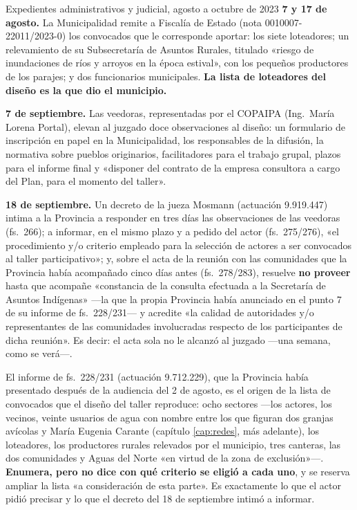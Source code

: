 \begin{ficha}{Expedientes administrativos y judicial, agosto a octubre de 2023}
\textbf{7 y 17 de agosto.} La Municipalidad remite a Fiscalía de Estado (nota 0010007-22011/2023-0) los convocados que le corresponde aportar: los siete loteadores; un relevamiento de su Subsecretaría de Asuntos Rurales, titulado «riesgo de inundaciones de ríos y arroyos en la época estival», con los pequeños productores de los parajes; y dos funcionarios municipales. \textbf{La lista de loteadores del diseño es la que dio el municipio.}

\textbf{7 de septiembre.} Las veedoras, representadas por el COPAIPA (Ing.\ María Lorena Portal), elevan al juzgado doce observaciones al diseño: un formulario de inscripción en papel en la Municipalidad, los responsables de la difusión, la normativa sobre pueblos originarios, facilitadores para el trabajo grupal, plazos para el informe final y «disponer del contrato de la empresa consultora a cargo del Plan, para el momento del taller».

\textbf{18 de septiembre.} Un decreto de la jueza Mosmann (actuación 9.919.447) intima a la Provincia a responder en tres días las observaciones de las veedoras (fs.\ 266); a informar, en el mismo plazo y a pedido del actor (fs.\ 275/276), «el procedimiento y/o criterio empleado para la selección de actores a ser convocados al taller participativo»; y, sobre el acta de la reunión con las comunidades que la Provincia había acompañado cinco días antes (fs.\ 278/283), resuelve \textbf{no proveer} hasta que acompañe «constancia de la consulta efectuada a la Secretaría de Asuntos Indígenas» ---la que la propia Provincia había anunciado en el punto 7 de su informe de fs.\ 228/231--- y acredite «la calidad de autoridades y/o representantes de las comunidades involucradas respecto de los participantes de dicha reunión». Es decir: el acta sola no le alcanzó al juzgado ---una semana, como se verá---.

El informe de fs.\ 228/231 (actuación 9.712.229), que la Provincia había presentado después de la audiencia del 2 de agosto, es el origen de la lista de convocados que el diseño del taller reproduce: ocho sectores ---los actores, los vecinos, veinte usuarios de agua con nombre entre los que figuran dos granjas avícolas y María Eugenia Carante (capítulo \ref{cap:redes}, más adelante), los loteadores, los productores rurales relevados por el municipio, tres canteras, las dos comunidades y Aguas del Norte «en virtud de la zona de exclusión»---. \textbf{Enumera, pero no dice con qué criterio se eligió a cada uno}, y se reserva ampliar la lista «a consideración de esta parte». Es exactamente lo que el actor pidió precisar y lo que el decreto del 18 de septiembre intimó a informar.


\end{ficha}
